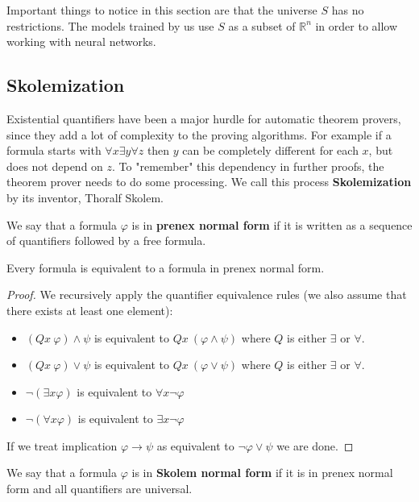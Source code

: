 Important things to notice in this section are that the universe $S$ has no restrictions. The models trained by us use $S$ as a subset of $\mathbb{R}^n$ in order to allow working with neural networks. 

\subsection{Skolemization}
Existential quantifiers have been a major hurdle for automatic theorem provers, since they add a lot of complexity to the proving algorithms. For example if a formula starts with $\forall x \exists y \forall z$ then $y$ can be completely different for each $x$, but does not depend on $z$. To "remember" this dependency in further proofs, the theorem prover needs to do some processing. We call this process \textbf{Skolemization} by its inventor, Thoralf Skolem.

\begin{defn}
	We say that a formula $\varphi$ is in \textbf{prenex normal form} if it is written as a sequence of quantifiers followed by a free formula.
\end{defn}

\begin{thm}
	Every formula is equivalent to a formula in prenex normal form.
\end{thm}
\begin{proof}
	We recursively apply the quantifier equivalence rules (we also assume that there exists at least one element):
	\begin{itemize}
		\item $(Q x\ \varphi)\wedge\psi$ is equivalent to $Q x\ (\varphi\wedge\psi)$ where $Q$ is either $\exists$ or $\forall$. 
		\item $(Q x\ \varphi)\vee\psi$ is equivalent to $Q x\ (\varphi\vee\psi)$ where $Q$ is either $\exists$ or $\forall$. 
		\item $\neg(\exists x\varphi)$ is equivalent to $\forall x \neg \varphi$
		\item $\neg(\forall x\varphi)$ is equivalent to $\exists x \neg \varphi$
	\end{itemize}
If we treat implication $\varphi \rightarrow \psi$ as equivalent to $\neg \varphi \vee \psi$ we are done.
\end{proof}

\begin{defn}
	We say that a formula $\varphi$ is in \textbf{Skolem normal form} if it is in prenex normal form and all quantifiers are universal.
\end{defn}

